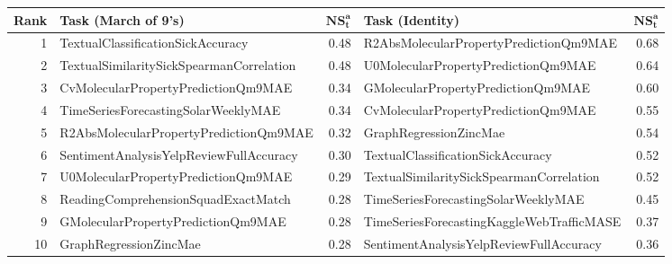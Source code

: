 \documentclass{fairmeta}
\begin{document}
\begin{longtable}{%
  >{\footnotesize}r
  >{\arraybackslash\footnotesize}p{}
  >{\footnotesize}r
  >{\arraybackslash\footnotesize}p{}
  >{\footnotesize}r
}

\toprule
\label{tab:task-key}
\centering \textbf{Rank} & \footnotesize\textbf{Task (March of 9's)} & \(\mathbf{NS_t^a}\) & \footnotesize\textbf{Task (Identity)} & \(\mathbf{NS_t^a}\) \\
\midrule
\rowcolor{easy!15} 1 & TextualClassificationSickAccuracy                  & 0.48 & R2AbsMolecularPropertyPredictionQm9MAE & 0.68 \\
\rowcolor{easy!15} 2 & TextualSimilaritySickSpearmanCorrelation           & 0.48 & U0MolecularPropertyPredictionQm9MAE & 0.64 \\
\rowcolor{easy!15} 3 & CvMolecularPropertyPredictionQm9MAE  & 0.34 & GMolecularPropertyPredictionQm9MAE & 0.60 \\
\rowcolor{easy!15} 4 & TimeSeriesForecastingSolarWeeklyMAE                & 0.34 & CvMolecularPropertyPredictionQm9MAE & 0.55 \\
\rowcolor{easy!15} 5 & R2AbsMolecularPropertyPredictionQm9MAE & 0.32 & GraphRegressionZincMae                        & 0.54 \\

\hline

\rowcolor{medium!15} 6 & SentimentAnalysisYelpReviewFullAccuracy            & 0.30 & TextualClassificationSickAccuracy             & 0.52 \\
\rowcolor{medium!15} 7 & U0MolecularPropertyPredictionQm9MAE  & 0.29 & TextualSimilaritySickSpearmanCorrelation      & 0.52 \\
\rowcolor{medium!15} 8 & ReadingComprehensionSquadExactMatch                & 0.28 & TimeSeriesForecastingSolarWeeklyMAE           & 0.45 \\
\rowcolor{medium!15} 9 & GMolecularPropertyPredictionQm9MAE   & 0.28 & TimeSeriesForecastingKaggleWebTrafficMASE     & 0.37 \\
\rowcolor{medium!15} 10 & GraphRegressionZincMae                             & 0.28 & SentimentAnalysisYelpReviewFullAccuracy       & 0.36 \\

\hline


\end{longtable}
\end{document}
